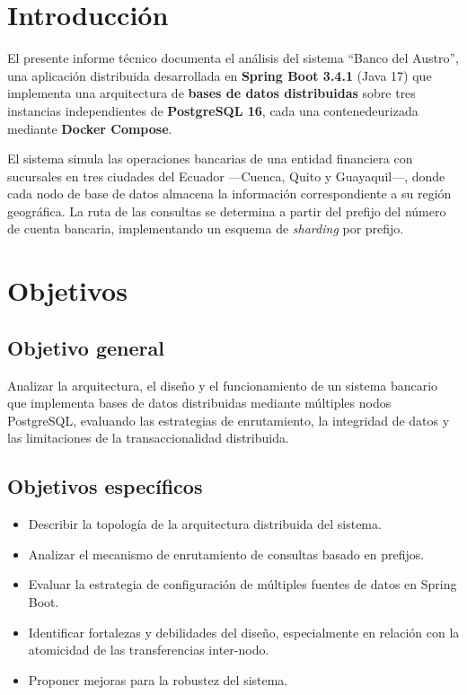 \documentclass[12pt, a4paper]{article}
\begin{document}
\section{Introducción}

El presente informe técnico documenta el análisis del sistema ``Banco del Austro'', una aplicación distribuida desarrollada en \textbf{Spring Boot 3.4.1} (Java 17) que implementa una arquitectura de \textbf{bases de datos distribuidas} sobre tres instancias independientes de \textbf{PostgreSQL 16}, cada una contenedeurizada mediante \textbf{Docker Compose}.

El sistema simula las operaciones bancarias de una entidad financiera con sucursales en tres ciudades del Ecuador ---Cuenca, Quito y Guayaquil---, donde cada nodo de base de datos almacena la información correspondiente a su región geográfica. La ruta de las consultas se determina a partir del prefijo del número de cuenta bancaria, implementando un esquema de \textit{sharding} por prefijo.

\section{Objetivos}

\subsection{Objetivo general}
Analizar la arquitectura, el diseño y el funcionamiento de un sistema bancario que implementa bases de datos distribuidas mediante múltiples nodos PostgreSQL, evaluando las estrategias de enrutamiento, la integridad de datos y las limitaciones de la transaccionalidad distribuida.

\subsection{Objetivos específicos}
\begin{itemize}
  \item Describir la topología de la arquitectura distribuida del sistema.
  \item Analizar el mecanismo de enrutamiento de consultas basado en prefijos.
  \item Evaluar la estrategia de configuración de múltiples fuentes de datos en Spring Boot.
  \item Identificar fortalezas y debilidades del diseño, especialmente en relación con la atomicidad de las transferencias inter-nodo.
  \item Proponer mejoras para la robustez del sistema.
\end{itemize}
\end{document}
